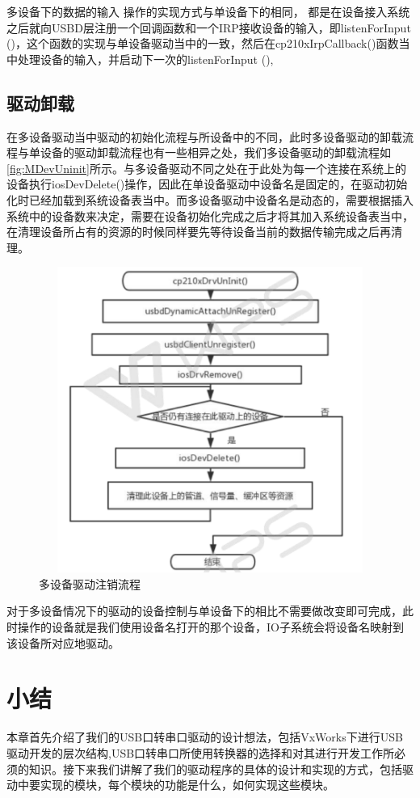 	
	多设备下的数据的输入  操作的实现方式与单设备下的相同， 都是在设备接入系统之后就向USBD层注册一个回调函数和一个IRP接收设备的输入，即listenForInput ()，这个函数的实现与单设备驱动当中的一致，然后在cp210xIrpCallback()函数当中处理设备的输入，并启动下一次的listenForInput (),



\subsection{驱动卸载}
	在多设备驱动当中驱动的初始化流程与所设备中的不同，此时多设备驱动的卸载流程与单设备的驱动卸载流程也有一些相异之处，我们多设备驱动的卸载流程如\autoref{fig:MDevUninit}所示。与多设备驱动不同之处在于此处为每一个连接在系统上的设备执行iosDevDelete()操作，因此在单设备驱动中设备名是固定的，在驱动初始化时已经加载到系统设备表当中。而多设备驱动中设备名是动态的，需要根据插入系统中的设备数来决定，需要在设备初始化完成之后才将其加入系统设备表当中，在清理设备所占有的资源的时候同样要先等待设备当前的数据传输完成之后再清理。
	
	
\begin{figure}[!h]
\centering
\includegraphics[width=12cm ,height=10cm]{./graphics/MDevUninit.pdf}
\caption{多设备驱动注销流程}\label{fig:MDevUninit}
\end{figure}


	对于多设备情况下的驱动的设备控制与单设备下的相比不需要做改变即可完成，此时操作的设备就是我们使用设备名打开的那个设备，IO子系统会将设备名映射到该设备所对应地驱动。





\section{小结}
	本章首先介绍了我们的USB口转串口驱动的设计想法，包括VxWorks下进行USB驱动开发的层次结构,USB口转串口所使用转换器的选择和对其进行开发工作所必须的知识。接下来我们讲解了我们的驱动程序的具体的设计和实现的方式，包括驱动中要实现的模块，每个模块的功能是什么，如何实现这些模块。



